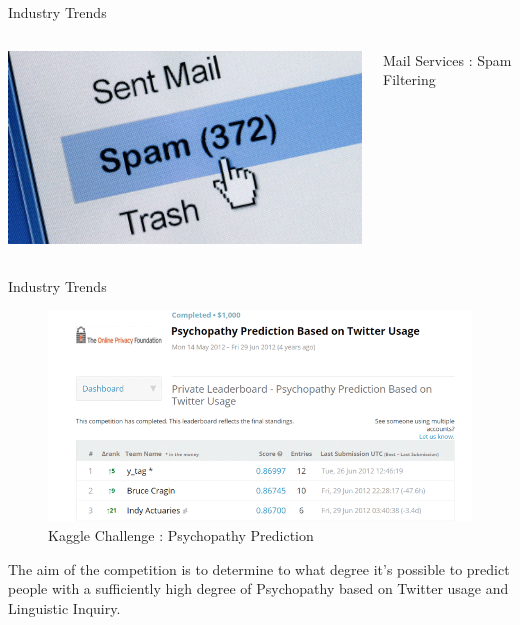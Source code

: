 \documentclass[10pt]{beamer}
\begin{document}
\begin{frame}{Industry Trends}
\begin{columns}
\begin{column}{0.5\textwidth}
\begin{center}
						\end{center}
					\end{column}
				\end{columns}
				\begin{columns}
					\begin{column}{0.5\textwidth}
						\begin{center}
							\includegraphics[width=0.9\linewidth]{images/app-5}
						\end{center}
					\end{column}
					\begin{column}{0.5\textwidth}
						\begin{center}
							Mail Services : Spam Filtering
						\end{center}
					\end{column}
				\end{columns}
			\end{frame}
			\begin{frame}{Industry Trends}
				\begin{figure}
					\centering
					\includegraphics[width=0.9\linewidth]{images/app-1}
					\caption{Kaggle Challenge : Psychopathy Prediction}
				\end{figure}
				\begin{center}
					The  aim of the competition is to determine to what degree it's possible to predict people with a sufficiently high degree of Psychopathy based on Twitter usage and Linguistic Inquiry.
				\end{center}
			\end{frame}
\end{document}
